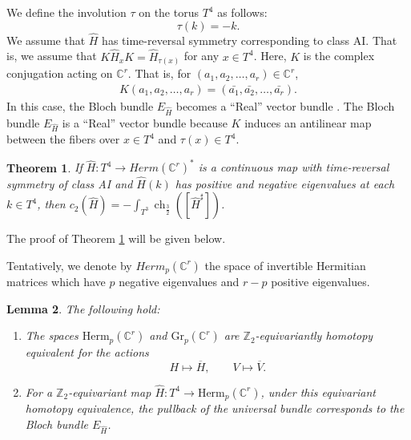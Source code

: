 \documentclass{amsart}
\newtheorem{thm}{Theorem}[section]
\newtheorem{lem}[thm]{Lemma}
\theoremstyle{definition}
\theoremstyle{remark}
\begin{document}
We define the involution \(\tau\) on the torus \(T^4\) as follows:  
\[
\tau(k)=-k.
\]  
We assume that $\hat{H}$ has time-reversal symmetry corresponding to class AI.
That is, we assume that $K\hat{H}_xK=\hat{H}_{\tau(x)}$ for any $x\in T^4$. Here, \(K\) is the complex conjugation acting on \(\mathbb{C}^r\). That is, for \((a_1, a_2, \dots, a_r) \in \mathbb{C}^r\),
\begin{align*}
K(a_1, a_2, \dots, a_r) = (\bar{a_1}, \bar{a_2}, \dots, \bar{a_r}).
\end{align*}
In this case, the Bloch bundle $E_{\hat{H}}$ becomes a “Real” vector bundle \cite{Atiyah66}. The Bloch bundle $E_{\hat{H}}$ is a “Real” vector bundle because $K$ induces an antilinear map between the fibers over $x \in T^4$ and $\tau(x) \in T^4$.

\begin{thm}\label{BG}
If $\hat{H} : T^4 \to Herm(\mathbb{C}^r)^*$ is a continuous map with time-reversal symmetry of class AI and $\hat{H}(k)$ has positive and negative eigenvalues at
each $k \in T^4$, then $c_2(\hat{H}) = -\int_{T^3}\operatorname{ch}_{\frac{3}{2}}([\hat{H}^\sharp])$.
\end{thm}

The proof of Theorem \ref{BG} will be given below.

Tentatively, we denote by $Herm_p(\mathbb{C}^r)$ the space of invertible Hermitian matrices which have $p$ negative eigenvalues and $r - p$ positive eigenvalues.

\begin{lem}\label{homotopy}
The following hold:
\begin{enumerate}
    \item The spaces \(\mathrm{Herm}_p(\mathbb{C}^r)\) and \(\mathrm{Gr}_p(\mathbb{C}^r)\) are \(\mathbb{Z}_2\)-equivariantly homotopy equivalent for the actions
    \[
    H \mapsto \overline{H}, \qquad V \mapsto \overline{V}.
    \]
    \item For a \(\mathbb{Z}_2\)-equivariant map \(\hat{H}:T^4\to \mathrm{Herm}_p(\mathbb{C}^r)\), under this equivariant homotopy equivalence, the pullback of the universal bundle corresponds to the Bloch bundle \(E_{\hat{H}}\).
\end{enumerate}
\end{lem}
\end{document}
